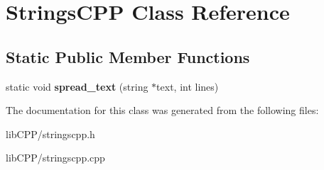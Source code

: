 \hypertarget{classStringsCPP}{\section{Strings\-C\-P\-P Class Reference}
\label{classStringsCPP}
}
\subsection*{Static Public Member Functions}
\begin{DoxyCompactItemize}
\item 
\hypertarget{classStringsCPP_ae478b8a05e718fa0dca8d6c81b7477c2}{static void {\bfseries spread\-\_\-text} (string $\ast$text, int lines)}\label{classStringsCPP_ae478b8a05e718fa0dca8d6c81b7477c2}

\end{DoxyCompactItemize}


The documentation for this class was generated from the following files\-:\begin{DoxyCompactItemize}
\item 
lib\-C\-P\-P/stringscpp.\-h\item 
lib\-C\-P\-P/stringscpp.\-cpp\end{DoxyCompactItemize}
